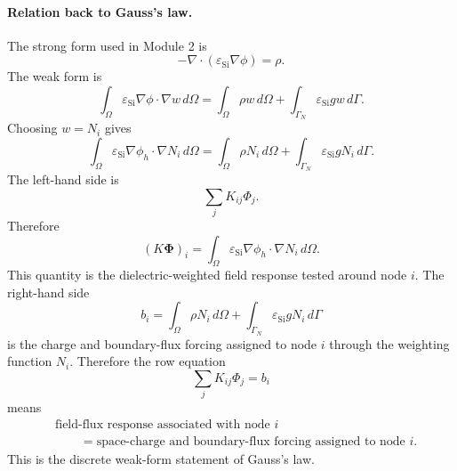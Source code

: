 \documentclass[11pt]{article}
\begin{document}
\paragraph{Relation back to Gauss's law.}
The strong form used in Module 2 is
\begin{equation}
-\nabla \cdot \left(\varepsilon_{\mathrm{Si}}\nabla\phi\right)=\rho.
\end{equation}
The weak form is
\begin{equation}
\int_{\Omega}\varepsilon_{\mathrm{Si}}\nabla\phi\cdot\nabla w\,d\Omega
=\int_{\Omega}\rho w\,d\Omega
+\int_{\Gamma_N}\varepsilon_{\mathrm{Si}}g w\,d\Gamma.
\end{equation}
Choosing $w=N_i$ gives
\begin{equation}
\int_{\Omega}\varepsilon_{\mathrm{Si}}\nabla\phi_h\cdot\nabla N_i\,d\Omega
=\int_{\Omega}\rho N_i\,d\Omega
+\int_{\Gamma_N}\varepsilon_{\mathrm{Si}}g N_i\,d\Gamma.
\end{equation}
The left-hand side is
\begin{equation}
\sum_j K_{ij}\Phi_j.
\end{equation}
Therefore
\begin{equation}
\boxed{
\left(K\bm{\Phi}\right)_i
= \int_{\Omega}\varepsilon_{\mathrm{Si}}\nabla\phi_h\cdot\nabla N_i\,d\Omega.
}
\end{equation}
This quantity is the dielectric-weighted field response tested around node $i$. The right-hand side
\begin{equation}
b_i=\int_{\Omega}\rho N_i\,d\Omega
+\int_{\Gamma_N}\varepsilon_{\mathrm{Si}}gN_i\,d\Gamma
\end{equation}
is the charge and boundary-flux forcing assigned to node $i$ through the weighting function $N_i$. Therefore the row equation
\begin{equation}
\sum_j K_{ij}\Phi_j=b_i
\end{equation}
means
\begin{equation}
\boxed{
\begin{aligned}
&\text{field-flux response associated with node } i \\
&\qquad = \text{space-charge and boundary-flux forcing assigned to node } i.
\end{aligned}
}
\end{equation}
This is the discrete weak-form statement of Gauss's law.
\end{document}

